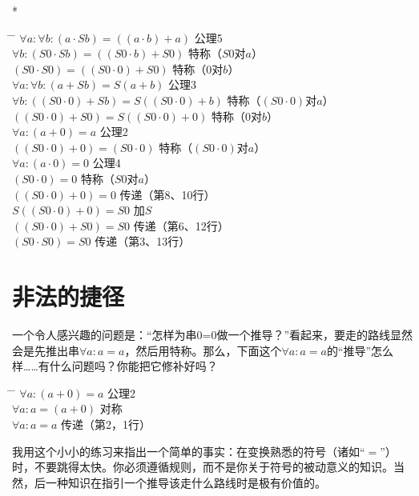 \begin{center}
* \quad * \quad * \quad * \quad *
\end{center}

\begin{tabbing*}
\qquad\qquad \= \tabindent{-2em} \= \+\kill
$\forall a:\forall b:(a\cdot Sb)=((a\cdot b)+a)$ \>公理5\\
$\forall b:(S0\cdot Sb)=((S0\cdot b)+S0)$        \>特称（$S0$对$a$）\\
$(S0\cdot S0)=((S0\cdot 0)+S0)$                  \>特称（$0$对$b$）\\
$\forall a:\forall b:(a+Sb)=S(a+b)$              \>公理3\\
$\forall b:((S0\cdot 0)+Sb)=S((S0\cdot 0)+b)$    \>特称（$(S0\cdot 0)$对$a$）\\
$((S0\cdot 0)+S0)=S((S0\cdot 0)+0)$              \>特称（$0$对$b$）\\
$\forall a:(a+0)=a$                              \>公理2\\
$((S0\cdot 0)+0)=(S0\cdot 0)$                    \>特称（$(S0\cdot 0)$对$a$）\\
$\forall a:(a\cdot 0)=0$                         \>公理4\\
$(S0\cdot 0)=0$                                  \>特称（$S0$对$a$）\\
$((S0\cdot 0)+0)=0$                              \>传递（第8、10行）\\
$S((S0\cdot 0)+0)=S0$                            \>加$S$\\
$((S0\cdot 0)+S0)=S0$                            \>传递（第6、12行）\\
$(S0\cdot S0)=S0$                                \>传递（第3、13行）
\end{tabbing*}

\section{非法的捷径}

一个令人感兴趣的问题是：“怎样为串0=0做一个推导？”看起来，要走的路线显然会是先推出串$\forall a:a=a$，然后用特称。那么，下面这个$\forall a:a=a$的“推导”怎么样……有什么问题吗？你能把它修补好吗？

\begin{tabbing*}
\qquad\qquad \= \tabindent{-2em} \= \+\kill
$\forall a:(a+0)=a$ \>公理2\\
$\forall a:a=(a+0)$ \>对称\\
$\forall a:a=a$     \>传递（第2，1行）
\end{tabbing*}
我用这个小小的练习来指出一个简单的事实：在变换熟悉的符号（诸如“$=$”）时，不要跳得太快。你必须遵循规则，而不是你关于符号的被动意义的知识。当然，后一种知识在指引一个推导该走什么路线时是极有价值的。

